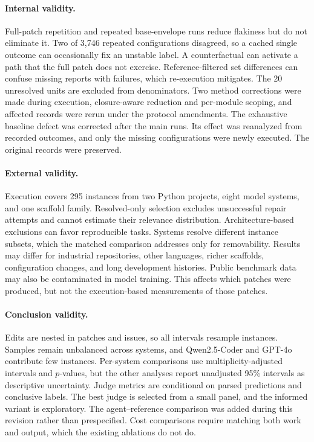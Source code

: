\documentclass[a4paper,fleqn]{cas-sc}
\begin{document}
\paragraph{Internal validity.}
Full-patch repetition and repeated base-envelope runs reduce flakiness but do not eliminate it. Two of 3,746 repeated configurations disagreed, so a cached single outcome can occasionally fix an unstable label. A counterfactual can activate a path that the full patch does not exercise. Reference-filtered set differences can confuse missing reports with failures, which re-execution mitigates. The 20 unresolved units are excluded from denominators. Two method corrections were made during execution, closure-aware reduction and per-module scoping, and affected records were rerun under the protocol amendments. The exhaustive baseline defect was corrected after the main runs. Its effect was reanalyzed from recorded outcomes, and only the missing configurations were newly executed. The original records were preserved.

\paragraph{External validity.}
Execution covers 295 instances from two Python projects, eight model systems, and one scaffold family. Resolved-only selection excludes unsuccessful repair attempts and cannot estimate their relevance distribution. Architecture-based exclusions can favor reproducible tasks. Systems resolve different instance subsets, which the matched comparison addresses only for removability. Results may differ for industrial repositories, other languages, richer scaffolds, configuration changes, and long development histories. Public benchmark data may also be contaminated in model training. This affects which patches were produced, but not the execution-based measurements of those patches.

\paragraph{Conclusion validity.}
Edits are nested in patches and issues, so all intervals resample instances. Samples remain unbalanced across systems, and Qwen2.5-Coder and GPT-4o contribute few instances. Per-system comparisons use multiplicity-adjusted intervals and $p$-values, but the other analyses report unadjusted 95\% intervals as descriptive uncertainty. Judge metrics are conditional on parsed predictions and conclusive labels. The best judge is selected from a small panel, and the informed variant is exploratory. The agent--reference comparison was added during this revision rather than prespecified. Cost comparisons require matching both work and output, which the existing ablations do not do.
\end{document}
